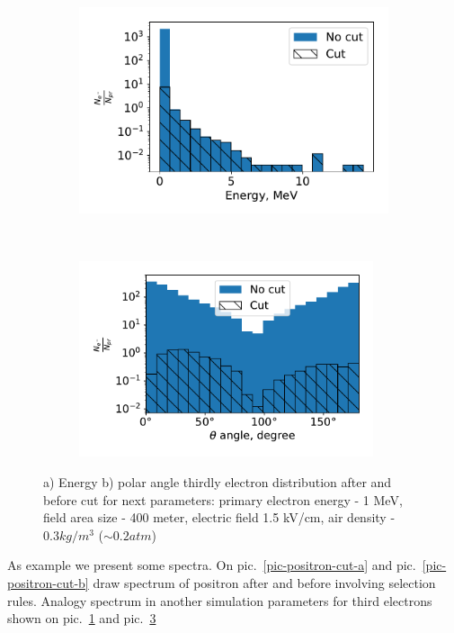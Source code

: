 \documentclass{webofc}
\begin{document}
\begin{figure}[ht!]
	\begin{subfigure}[b]{0.5\textwidth}
    	\includegraphics[width=0.95\linewidth]{pictures/06_energy_cut_electron}
        \caption{}
        \label{pic-electron-cut-a}
    \end{subfigure}
	~
    \begin{subfigure}[b]{0.5\textwidth}
		\includegraphics[width=0.95\textwidth]{pictures/07_theta_cut_electron}
        \caption{}
        \label{pic-electron-cut-b}
    \end{subfigure}
    \caption{ a) Energy b) polar angle thirdly electron distribution after and before cut for next parameters: primary electron energy - 1 MeV, field area size - 400 meter, electric field 1.5 kV/cm, air density - $0.3 kg/m^3$ ($\sim 0.2 atm$)}
\end{figure}

As example we present some spectra. On pic.~\ref{pic-positron-cut-a} and pic.~\ref{pic-positron-cut-b} draw spectrum of positron after and before involving selection rules. Analogy spectrum in another simulation parameters for third electrons shown on pic.~\ref{pic-electron-cut-a} and pic.~\ref{pic-electron-cut-b}
\end{document}
